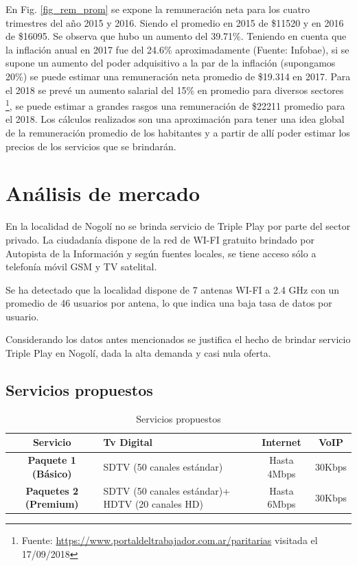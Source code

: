\documentclass[12pt,a4paper]{book}
\begin{document}
En Fig. \ref{fig_rem_prom} se expone la remuneración neta para los cuatro trimestres del año 2015 y 2016. Siendo el promedio en 2015 de \$11520 y en 2016 de \$16095. Se observa que hubo un aumento del 39.71\%. Teniendo en cuenta que la inflación anual en 2017 fue del 24.6\% aproximadamente (Fuente: Infobae), si se supone un aumento del poder adquisitivo a la par de la inflación (supongamos 20\%) se puede estimar una remuneración neta promedio de \$19.314 en 2017. Para el 2018 se prevé un aumento salarial del 15\% en promedio para diversos sectores \footnote{Fuente: \url{https://www.portaldeltrabajador.com.ar/paritarias} visitada el 17/09/2018}, se puede estimar a grandes rasgos una remuneración de \$22211 promedio para el 2018. Los cálculos realizados son una aproximación para tener una idea global de la remuneración promedio de los habitantes y a partir de allí poder estimar los precios de los servicios que se brindarán.



\chapter{Análisis de mercado} \label{sec_analisis_mercado}

En la localidad de Nogolí no se brinda servicio de Triple Play por parte del sector privado. La ciudadanía dispone de la red de WI-FI gratuito brindado por Autopista de la Información y según fuentes locales, se tiene acceso sólo a telefonía móvil GSM y TV satelital.

Se ha detectado que la localidad dispone de 7 antenas WI-FI a 2.4 GHz con un promedio de 46 usuarios por antena, lo que indica una baja tasa de datos por usuario.

Considerando los datos antes mencionados se justifica el hecho de brindar servicio Triple Play en Nogolí, dada la alta demanda y casi nula oferta.

\section{Servicios propuestos}

\begin{table}[H]
\centering
\begin{tabular}{|c|>{\centering}m{6cm}|c|c|}
\hline 
\textbf{Servicio} & \textbf{Tv Digital} & \textbf{Internet} & \textbf{VoIP} \\ 
\hline 
\textbf{Paquete 1 (Básico)} & SDTV (50 canales estándar) & Hasta 4Mbps & 30Kbps \\ 
\hline 
\textbf{Paquetes 2 (Premium)} & SDTV (50 canales estándar)+ HDTV (20 canales HD) & Hasta 6Mbps & 30Kbps \\ 
\hline 
\end{tabular}
\caption{Servicios propuestos}
\label{tab_serv_prop_dem}
\end{table}
\end{document}
